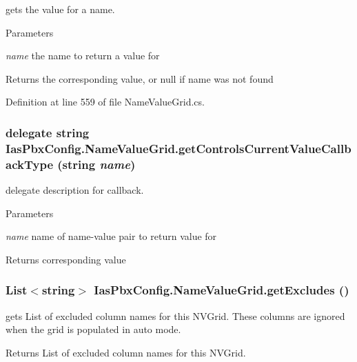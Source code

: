 gets the value for a name. 
\begin{DoxyParams}{Parameters}
\item[{\em name}]the name to return a value for \end{DoxyParams}
\begin{DoxyReturn}{Returns}
the corresponding value, or null if name was not found 
\end{DoxyReturn}


Definition at line 559 of file NameValueGrid.cs.\hypertarget{class_ias_pbx_config_1_1_name_value_grid_a3d9ca74d6c6ede38ee0e947b2a78d2c1}{
\subsubsection[{getControlsCurrentValueCallbackType}]{\setlength{\rightskip}{0pt plus 5cm}delegate string IasPbxConfig.NameValueGrid.getControlsCurrentValueCallbackType (string {\em name})}}
\label{class_ias_pbx_config_1_1_name_value_grid_a3d9ca74d6c6ede38ee0e947b2a78d2c1}


delegate description for callback. 
\begin{DoxyParams}{Parameters}
\item[{\em name}]name of name-\/value pair to return value for \end{DoxyParams}
\begin{DoxyReturn}{Returns}
corresponding value 
\end{DoxyReturn}
\hypertarget{class_ias_pbx_config_1_1_name_value_grid_ac00f102d1ab5b370a866b09b4855594c}{
\subsubsection[{getExcludes}]{\setlength{\rightskip}{0pt plus 5cm}List$<$string$>$ IasPbxConfig.NameValueGrid.getExcludes ()}}
\label{class_ias_pbx_config_1_1_name_value_grid_ac00f102d1ab5b370a866b09b4855594c}


gets List of excluded column names for this NVGrid. These columns are ignored when the grid is populated in auto mode. \begin{DoxyReturn}{Returns}
List of excluded column names for this NVGrid. 
\end{DoxyReturn}


